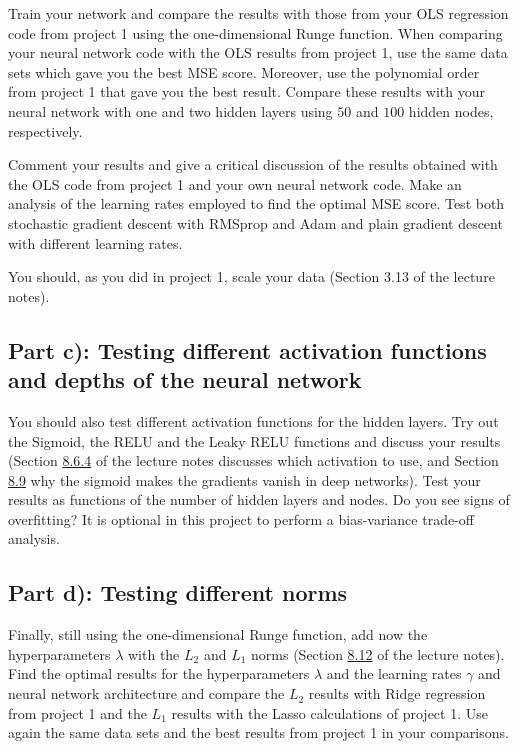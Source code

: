 \documentclass[11pt,a4paper]{article}
\begin{document}
Train your network and compare the results with those from your OLS
regression code from project 1 using the one-dimensional Runge function.
When comparing your neural network code with the OLS results from project 1,
use the same data sets which gave you the best MSE score.  Moreover, use the
polynomial order from project 1 that gave you the best result.  Compare these
results with your neural network with one and two hidden layers using $50$
and $100$ hidden nodes, respectively.

Comment your results and give a critical discussion of the results obtained
with the OLS code from project 1 and your own neural network code.  Make an
analysis of the learning rates employed to find the optimal MSE score.  Test
both stochastic gradient descent with RMSprop and Adam and plain gradient
descent with different learning rates.

You should, as you did in project 1, scale your data (Section 3.13 of the
lecture notes).

\subsection*{Part c): Testing different activation functions and depths of the neural network}

You should also test different activation functions for the hidden layers.
Try out the Sigmoid, the RELU and the Leaky RELU functions and discuss your
results (Section
\href{https://educationalmaterialuio.github.io/MachineLearningUiO/doc/LectureNotes/_build/html/chapter8.html#which-activation-should-we-use}{8.6.4}
of the lecture notes discusses which activation to use, and Section
\href{https://educationalmaterialuio.github.io/MachineLearningUiO/doc/LectureNotes/_build/html/chapter8.html#vanishing-and-exploding-gradients}{8.9}
why the sigmoid makes the gradients vanish in deep networks).  Test your
results as functions of the number of hidden layers and nodes.  Do you see
signs of overfitting?  It is optional in this project to perform a
bias-variance trade-off analysis.

\subsection*{Part d): Testing different norms}

Finally, still using the one-dimensional Runge function, add now the
hyperparameters $\lambda$ with the $L_2$ and $L_1$ norms (Section
\href{https://educationalmaterialuio.github.io/MachineLearningUiO/doc/LectureNotes/_build/html/chapter8.html#regularisation-and-hyperparameters}{8.12}
of the lecture notes).  Find the optimal results for the hyperparameters
$\lambda$ and the learning rates $\gamma$ and neural network architecture
and compare the $L_2$ results with Ridge regression from project 1 and the
$L_1$ results with the Lasso calculations of project 1.  Use again the same
data sets and the best results from project 1 in your comparisons.
\end{document}
